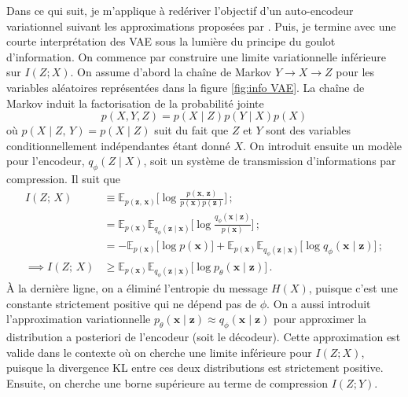 Dans ce qui suit, je m'applique à redériver l'objectif d'un auto-encodeur variationnel suivant les approximations 
proposées par \citet{Alemi2017}. Puis, je termine avec une courte interprétation des VAE sous la lumière du principe du goulot d'information.
On commence par construire une limite variationnelle inférieure sur $I(Z; X)$. 
On assume d'abord la chaîne de Markov $Y \rightarrow X \rightarrow Z$ pour les variables 
aléatoires représentées dans la figure \ref{fig:info VAE}. La chaîne de Markov 
induit la factorisation de la probabilité jointe
\begin{equation}\label{eq:factorisation}
       p(X, Y, Z) = p(X \mid Z) p(Y \mid X) p(X) 
\end{equation} 
où $p(X \mid Z,\, Y) = p(X \mid Z)$ suit du fait que $Z$ et $Y$ sont des variables conditionnellement indépendantes étant donné $X$.
On introduit ensuite un modèle pour l'encodeur,
$q_\phi (Z \mid X)$, soit un système de transmission d'informations par compression. Il 
suit que 
\begin{align}
        I(Z;\, X) &\equiv \mathbb{E}_{p(\mathbf{z},\, \mathbf{x})} \bigg[\log \frac{p(\mathbf{x},\, \mathbf{z})}{p(\mathbf{x}) p(\mathbf{z})} \bigg]\, ;  \\[1.5ex]
        &= \mathbb{E}_{p(\mathbf{x})}\mathbb{E}_{q_\phi(\mathbf{z} \mid \mathbf{x})} \bigg[\log \frac{q_\phi(\mathbf{x} \mid \mathbf{z})}{p(\mathbf{x})} \bigg]\, ;  \\[1.5ex]
                &= -\mathbb{E}_{p(\mathbf{x})}\bigg[\log p(\mathbf{x}) \bigg]  
                + \mathbb{E}_{p(\mathbf{x})}\mathbb{E}_{q_\phi(\mathbf{z} \mid \mathbf{x})} \bigg[\log q_\phi(\mathbf{x} \mid \mathbf{z})\bigg]\, ;  \\[1.5ex]
                \label{eq:maximum info}
                \implies I(Z;\, X)&\geq \mathbb{E}_{p(\mathbf{x})}\mathbb{E}_{q_\phi(\mathbf{z} \mid \mathbf{x})} \bigg[\log p_\theta (\mathbf{x} \mid \mathbf{z})\bigg]\, .
\end{align}
À la dernière ligne, on a éliminé l'entropie du message $H(X)$, puisque c'est une constante strictement positive qui ne dépend pas de $\phi$.
On a aussi introduit l'approximation variationnelle $p_\theta (\mathbf{x} \mid \mathbf{z}) \approx q_\phi (\mathbf{x} \mid \mathbf{z})$ 
pour approximer la distribution a posteriori de l'encodeur (soit le décodeur). Cette approximation est valide dans le contexte où 
on cherche une limite inférieure pour $I(Z; X)$, puisque la divergence KL entre ces deux distributions est strictement positive.
Ensuite, on cherche une borne supérieure au terme de compression $I(Z; Y)$. 
